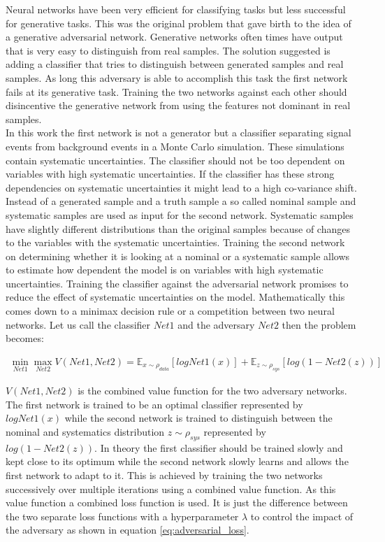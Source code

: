 Neural networks have been very efficient for classifying tasks but less successful for generative tasks. This was the original problem that gave birth to the idea of a generative adversarial network. Generative networks often times have output that is very easy to distinguish from real samples. The solution suggested is adding a classifier that tries to distinguish between generated samples and real samples. As long this adversary is able to accomplish this task the first network fails at its generative task. Training the two networks against each other should disincentive the generative network from using the features not dominant in real samples.\\
In this work the first network is not a generator but a classifier separating signal events from background events in a Monte Carlo simulation. These simulations contain systematic uncertainties. The classifier should not be too dependent on variables with high systematic uncertainties. If the classifier has these strong dependencies on systematic uncertainties it might lead to a high co-variance shift. Instead of a generated sample and a truth sample a so called nominal sample and systematic samples are used as input for the second network. Systematic samples have slightly different distributions than the original samples because of changes to the variables with the systematic uncertainties. Training the second network on determining whether it is looking at a nominal or a systematic sample allows to estimate how dependent the model is on variables with high systematic uncertainties. Training the classifier against the adversarial network promises to reduce the effect of systematic uncertainties on the model.
Mathematically this comes down to a minimax decision rule or a competition between two neural networks. Let us call the classifier $Net1$ and the adversary $Net2$ then the problem becomes:

\begin{align}
    \min_{Net1} \max_{Net2} V(Net1, Net2) = \mathbb{E}_{\mathit{x} \sim \rho_{data}} [ log Net1(\mathit{x}) ] + \mathbb{E}_{\mathit{z} \sim \rho_{sys}} [ log (1 - Net2(\mathit{z}) ) ]
\end{align}

$V(Net1, Net2)$ is the combined value function for the two adversary networks. The first network is trained to be an optimal classifier represented by $log Net1(\mathit{x})$ while the second network is trained to distinguish between the nominal and systematics distribution $\mathit{z} \sim \rho_{sys}$ represented by $log (1 - Net2(\mathit{z}))$. In theory the first classifier should be trained slowly and kept close to its optimum while the second network slowly learns and allows the first network to adapt to it. This is achieved by training the two networks successively over multiple iterations using a combined value function.
As this value function a combined loss function is used. It is just the difference between the two separate loss functions with a hyperparameter $\lambda$ to control the impact of the adversary as shown in equation \eqref{eq:adversarial_loss}.

